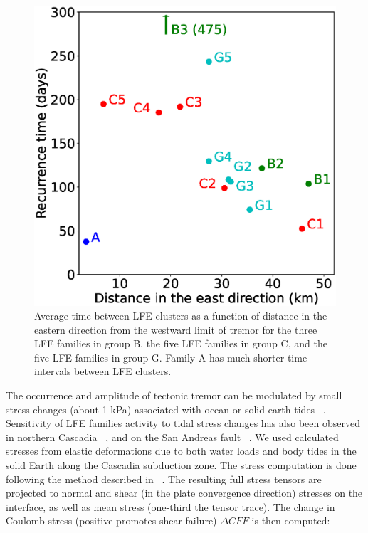 \documentclass[draft]{agujournal2019}
\begin{document}
\begin{figure}
\noindent\includegraphics[width=\textwidth, trim={0cm 0cm 0cm 0cm},clip]{figures/nb_LFE_events.eps}
\caption{Average time between LFE clusters as a function of distance in the eastern direction from the westward limit of tremor for the three LFE families in group B, the five LFE families in group C, and the five LFE families in group G. Family A has much shorter time intervals between LFE clusters.}
\label{pngfiguresample}
\end{figure}

The occurrence and amplitude of tectonic tremor can be modulated by small stress changes (about 1 kPa) associated with ocean or solid earth tides ~\cite{SHE_2007_G3,HOU_2011,HOU_2015}. Sensitivity of LFE families activity to tidal stress changes has also been observed in northern Cascadia ~\cite{ROY_2015}, and on the San Andreas fault ~\cite{THO_2012}. We used calculated stresses from elastic deformations due to both water loads and body tides in the solid Earth along the Cascadia subduction zone. The stress computation is done following the method described in ~. The resulting full stress tensors are projected to normal and shear (in the plate convergence direction) stresses on the interface, as well as mean stress (one-third the tensor trace). The change in Coulomb stress (positive promotes shear failure) $\Delta CFF$ is then computed:
\end{document}
